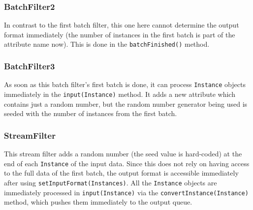 {\scriptsize }

\newpage
\subsubsection*{BatchFilter2}
In contrast to the first batch filter, this one here cannot determine the output
format immediately (the number of instances in the first batch is part of the
attribute name now). This is done in the \texttt{batchFinished()} method.

{\scriptsize }

\newpage
\subsubsection*{BatchFilter3}
As soon as this batch filter's first batch is done, it can process
\texttt{Instance} objects immediately in the \texttt{input(Instance)} method. It
adds a new attribute which contains just a random number, but the random number
generator being used is seeded with the number of instances from the first
batch.

{\scriptsize }

\newpage
\subsubsection*{StreamFilter}
This stream filter adds a random number (the seed value is hard-coded) at the
end of each \texttt{Instance} of the input data. Since this does not rely on
having access to the full data of the first batch, the output format is
accessible immediately after using \texttt{setInputFormat(Instances)}. All the
\texttt{Instance} objects are immediately processed in \texttt{input(Instance)}
via the \texttt{convertInstance(Instance)} method, which pushes them immediately
to the output queue.

{\scriptsize }

\newpage
